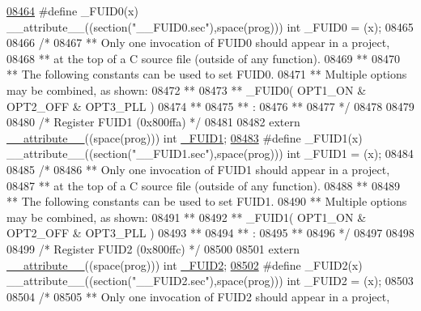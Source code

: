 \begin{DoxyCode}
{{{{\hypertarget{a00015_source_l08464}{}\hyperlink{a00015_a8f1f7e736797ec125ac83da190ad1875}{08464} \textcolor{preprocessor}{#define \_FUID0(x) \_\_attribute\_\_((section("\_\_FUID0.sec"),space(prog))) int \_FUID0 = (x);}
08465 
08466 \textcolor{comment}{/*}
08467 \textcolor{comment}{** Only one invocation of FUID0 should appear in a project,}
08468 \textcolor{comment}{** at the top of a C source file (outside of any function).}
08469 \textcolor{comment}{**}
08470 \textcolor{comment}{** The following constants can be used to set FUID0.}
08471 \textcolor{comment}{** Multiple options may be combined, as shown:}
08472 \textcolor{comment}{**}
08473 \textcolor{comment}{** \_FUID0( OPT1\_ON & OPT2\_OFF & OPT3\_PLL )}
08474 \textcolor{comment}{**}
08475 \textcolor{comment}{**   :}
08476 \textcolor{comment}{**}
08477 \textcolor{comment}{*/}
08478 
08479 
08480 \textcolor{comment}{/* Register FUID1 (0x800ffa)                               */}
08481 
08482 \textcolor{keyword}{extern} \hyperlink{a00015_a493c46f03454991ccc5aa7a6e1dfb2a7}{\_\_attribute\_\_}((space(prog))) int \hyperlink{a00015_afe148acf23d7d7441a11da1e1eede2ae}{\_FUID1};
\hypertarget{a00015_source_l08483}{}\hyperlink{a00015_afe148acf23d7d7441a11da1e1eede2ae}{08483} \textcolor{preprocessor}{#define \_FUID1(x) \_\_attribute\_\_((section("\_\_FUID1.sec"),space(prog))) int \_FUID1 = (x);}
08484 
08485 \textcolor{comment}{/*}
08486 \textcolor{comment}{** Only one invocation of FUID1 should appear in a project,}
08487 \textcolor{comment}{** at the top of a C source file (outside of any function).}
08488 \textcolor{comment}{**}
08489 \textcolor{comment}{** The following constants can be used to set FUID1.}
08490 \textcolor{comment}{** Multiple options may be combined, as shown:}
08491 \textcolor{comment}{**}
08492 \textcolor{comment}{** \_FUID1( OPT1\_ON & OPT2\_OFF & OPT3\_PLL )}
08493 \textcolor{comment}{**}
08494 \textcolor{comment}{**   :}
08495 \textcolor{comment}{**}
08496 \textcolor{comment}{*/}
08497 
08498 
08499 \textcolor{comment}{/* Register FUID2 (0x800ffc)                               */}
08500 
08501 \textcolor{keyword}{extern} \hyperlink{a00015_a493c46f03454991ccc5aa7a6e1dfb2a7}{\_\_attribute\_\_}((space(prog))) int \hyperlink{a00015_a170e7798217d48d4583dc6e39eac810a}{\_FUID2};
\hypertarget{a00015_source_l08502}{}\hyperlink{a00015_a170e7798217d48d4583dc6e39eac810a}{08502} \textcolor{preprocessor}{#define \_FUID2(x) \_\_attribute\_\_((section("\_\_FUID2.sec"),space(prog))) int \_FUID2 = (x);}
08503 
08504 \textcolor{comment}{/*}
08505 \textcolor{comment}{** Only one invocation of FUID2 should appear in a project,}
}}}}
\end{DoxyCode}

